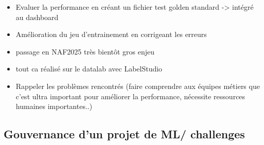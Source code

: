 \begin{itemize}
    \item Evaluer la performance en créant un fichier test golden standard -> intégré au dashboard
    \item Amélioration du jeu d'entrainement en corrigeant les erreurs
    \item passage en NAF2025 très bientôt gros enjeu
    \item tout ca réalisé sur le datalab avec LabelStudio
    \item Rappeler les problèmes rencontrés (faire comprendre aux équipes métiers que c'est ultra important pour améliorer la performance, nécessite ressources humaines importantes..)
\end{itemize}


\subsection{Gouvernance d'un projet de ML/ challenges}

